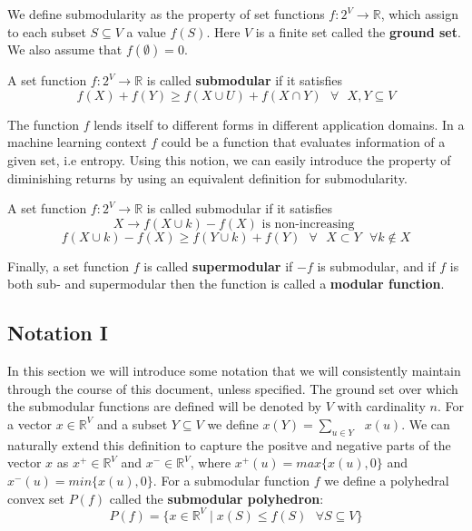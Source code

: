 We define submodularity as the property of set functions $f:2^V \rightarrow \mathds{R}$, which assign to each subset $S \subseteq V$ a value $f(S)$. Here $V$ is a finite set called the {\bf ground set}. We also assume that $f(\emptyset) = 0$.

\begin{definitions}
A set function $f:2^V \rightarrow \mathds{R}$ is called \textbf{submodular} if it satisfies
\[
 f(X) + f(Y) \geq f(X \cup U) + f(X \cap Y) \text{  } \forall \text{  } X,Y \subseteq V
\]
\end{definitions}

The function $f$ lends itself to different forms in different application domains. In a machine learning context $f$ could be a function that evaluates information of a given set, i.e entropy. Using this notion, we can easily introduce the property of diminishing returns by using an equivalent definition for submodularity.

\begin{definitions}
A set function $f:2^V \rightarrow \mathds{R}$ is called submodular if it satisfies
\[
 X \rightarrow f(X\cup {k}) - f(X) \text{ is non-increasing }
 \]
 \[
 f(X \cup {k}) - f(X) \geq f(Y \cup {k}) + f(Y) \text{  } \forall \text{  } X\subset Y \text{  } \forall k \notin X
\]
\end{definitions}

Finally, a set function $f$ is called {\bf supermodular} if $-f$ is submodular, and if $f$ is both sub- and supermodular then the function is called a {\bf modular function}.

\subsection{Notation I}
\label{sec:notation}
In this section we will introduce some notation that we will consistently maintain through the course of this document, unless specified. The ground set over which the submodular functions are defined will be denoted by $V$ with cardinality $n$. For a vector $x \in \mathds{R}^V$ and a subset $Y \subseteq V$ we define $x(Y) = \underset{u \in Y}{\operatorname{\sum }}\text{ } x(u)$. We can naturally extend this definition to capture the positve and negative parts of the vector $x$ as $x^+\in \mathds{R}^V$ and $x^-\in \mathds{R}^V$, where $x^+(u) = max\{x(u),0\}$ and $x^-(u) = min\{x(u),0\}$. For a submodular function $f$ we define a polyhedral convex set $P(f)$ called the {\bf submodular polyhedron}:\\
\[
 P(f) = \{ x\in \mathds{R}^V \mid x(S) \leq f(S) \text{ }\forall S\subseteq V \}
\]

